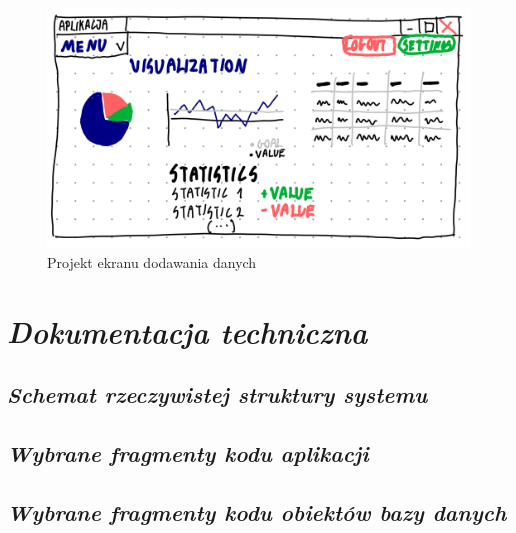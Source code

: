 \documentclass[a4paper,10pt, twoside]{report}
\newcommand{\customstylechapter}[1]{\large{\textit{#1}}}
\newcommand{\customstylesection}[1]{\textbf{\textit{#1}}}
\begin{document}
\begin{large}
\begin{figure}[H]           %
    \centering
    \includegraphics[width=12cm]{figures/Righten_UI_sketch_viusalizations.png}
    \caption{Projekt ekranu dodawania danych}
    \label{fig:uiprojectvisualizations}
\end{figure}

\chapter{\customstylechapter{Dokumentacja techniczna}}
{}


\section{\customstylesection{Schemat rzeczywistej struktury systemu}}
{}

\section{\customstylesection{Wybrane fragmenty kodu aplikacji}}
{}

\section{\customstylesection{Wybrane fragmenty kodu obiektów bazy danych}}
{}


\end{large}
\end{document}
